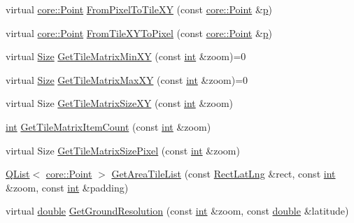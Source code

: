 \begin{DoxyCompactItemize}
\item 
virtual \hyperlink{structcore_1_1_point}{core\-::\-Point} \hyperlink{group___o_p_map_widget_ga44846fe14a2b915a79c730b0b6513579}{From\-Pixel\-To\-Tile\-X\-Y} (const \hyperlink{structcore_1_1_point}{core\-::\-Point} \&\hyperlink{glext_8h_aa5367c14d90f462230c2611b81b41d23}{p})
\item 
virtual \hyperlink{structcore_1_1_point}{core\-::\-Point} \hyperlink{group___o_p_map_widget_ga6eb6b9db59d0e4e58f4e70c4d4d2887a}{From\-Tile\-X\-Y\-To\-Pixel} (const \hyperlink{structcore_1_1_point}{core\-::\-Point} \&\hyperlink{glext_8h_aa5367c14d90f462230c2611b81b41d23}{p})
\item 
virtual \hyperlink{structcore_1_1_size}{Size} \hyperlink{group___o_p_map_widget_ga655cbf971f1a5d2df37f97d6e7b422f5}{Get\-Tile\-Matrix\-Min\-X\-Y} (const \hyperlink{ioapi_8h_a787fa3cf048117ba7123753c1e74fcd6}{int} \&zoom)=0
\item 
virtual \hyperlink{structcore_1_1_size}{Size} \hyperlink{group___o_p_map_widget_ga5588735ea108bf7743f87c86fe14f3f1}{Get\-Tile\-Matrix\-Max\-X\-Y} (const \hyperlink{ioapi_8h_a787fa3cf048117ba7123753c1e74fcd6}{int} \&zoom)=0
\item 
virtual Size \hyperlink{group___o_p_map_widget_ga4ae08027e37b2017b358d8fbe75ae5c6}{Get\-Tile\-Matrix\-Size\-X\-Y} (const \hyperlink{ioapi_8h_a787fa3cf048117ba7123753c1e74fcd6}{int} \&zoom)
\item 
\hyperlink{ioapi_8h_a787fa3cf048117ba7123753c1e74fcd6}{int} \hyperlink{group___o_p_map_widget_ga9729f2fced303b2b353fbb8349a16a18}{Get\-Tile\-Matrix\-Item\-Count} (const \hyperlink{ioapi_8h_a787fa3cf048117ba7123753c1e74fcd6}{int} \&zoom)
\item 
virtual Size \hyperlink{group___o_p_map_widget_ga2756c4a5e52399306da81bb913106474}{Get\-Tile\-Matrix\-Size\-Pixel} (const \hyperlink{ioapi_8h_a787fa3cf048117ba7123753c1e74fcd6}{int} \&zoom)
\item 
\hyperlink{class_q_list}{Q\-List}$<$ \hyperlink{structcore_1_1_point}{core\-::\-Point} $>$ \hyperlink{group___o_p_map_widget_gab8c7480cc18ebba515ca1c9c4258a2fd}{Get\-Area\-Tile\-List} (const \hyperlink{structinternals_1_1_rect_lat_lng}{Rect\-Lat\-Lng} \&rect, const \hyperlink{ioapi_8h_a787fa3cf048117ba7123753c1e74fcd6}{int} \&zoom, const \hyperlink{ioapi_8h_a787fa3cf048117ba7123753c1e74fcd6}{int} \&padding)
\item 
virtual \hyperlink{_super_l_u_support_8h_a8956b2b9f49bf918deed98379d159ca7}{double} \hyperlink{group___o_p_map_widget_ga40a54138c94f8707cc2e2d9f2c5e1297}{Get\-Ground\-Resolution} (const \hyperlink{ioapi_8h_a787fa3cf048117ba7123753c1e74fcd6}{int} \&zoom, const \hyperlink{_super_l_u_support_8h_a8956b2b9f49bf918deed98379d159ca7}{double} \&latitude)

\end{DoxyCompactItemize}
